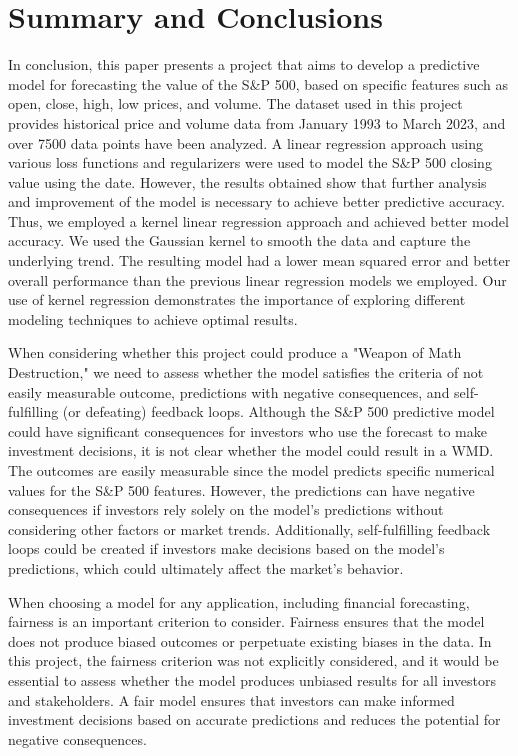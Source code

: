 \documentclass[final,5p,times,twocolumn,authoryear, 12pt]{elsarticle}
\begin{document}
\section{Summary and Conclusions}

In conclusion, this paper presents a project that aims to develop a predictive model for forecasting the value of the S\&P 500, based on specific features such as open, close, high, low prices, and volume. The dataset used in this project provides historical price and volume data from January 1993 to March 2023, and over 7500 data points have been analyzed. A linear regression approach using various loss functions and regularizers were used to model the S\&P 500 closing value using the date. However, the results obtained show that further analysis and improvement of the model is necessary to achieve better predictive accuracy. Thus, we employed a kernel linear regression approach and achieved better model accuracy. We used the Gaussian kernel to smooth the data and capture the underlying trend. The resulting model had a lower mean squared error and better overall performance than the previous linear regression models we employed. Our use of kernel regression demonstrates the importance of exploring different modeling techniques to achieve optimal results.

When considering whether this project could produce a "Weapon of Math Destruction," we need to assess whether the model satisfies the criteria of not easily measurable outcome, predictions with negative consequences, and self-fulfilling (or defeating) feedback loops. Although the S\&P 500 predictive model could have significant consequences for investors who use the forecast to make investment decisions, it is not clear whether the model could result in a WMD. The outcomes are easily measurable since the model predicts specific numerical values for the S\&P 500 features. However, the predictions can have negative consequences if investors rely solely on the model's predictions without considering other factors or market trends. Additionally, self-fulfilling feedback loops could be created if investors make decisions based on the model's predictions, which could ultimately affect the market's behavior.

When choosing a model for any application, including financial forecasting, fairness is an important criterion to consider. Fairness ensures that the model does not produce biased outcomes or perpetuate existing biases in the data. In this project, the fairness criterion was not explicitly considered, and it would be essential to assess whether the model produces unbiased results for all investors and stakeholders. A fair model ensures that investors can make informed investment decisions based on accurate predictions and reduces the potential for negative consequences.
\end{document}
